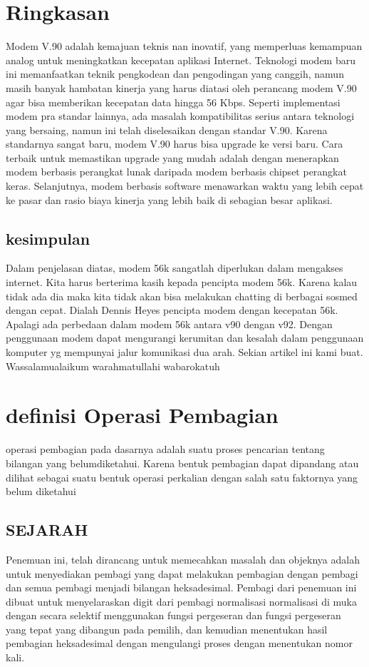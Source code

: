 \section{Ringkasan}

Modem V.90 adalah kemajuan teknis nan inovatif, yang memperluas kemampuan analog untuk meningkatkan kecepatan aplikasi Internet. Teknologi modem baru ini memanfaatkan teknik pengkodean dan pengodingan yang canggih, namun masih banyak hambatan kinerja yang harus diatasi oleh perancang modem V.90 agar bisa memberikan kecepatan data hingga 56 Kbps. Seperti implementasi modem pra standar lainnya, ada masalah kompatibilitas serius antara teknologi yang bersaing, namun ini telah diselesaikan dengan standar V.90. Karena standarnya sangat baru, modem V.90 harus bisa upgrade ke versi baru. Cara terbaik untuk memastikan upgrade yang mudah adalah dengan menerapkan modem berbasis perangkat lunak daripada modem berbasis chipset perangkat keras. Selanjutnya, modem berbasis software menawarkan waktu yang lebih cepat ke pasar dan rasio biaya kinerja yang lebih baik di sebagian besar aplikasi.

\subsection{kesimpulan}

Dalam penjelasan diatas, modem 56k sangatlah diperlukan dalam mengakses internet. Kita harus berterima kasih kepada pencipta modem 56k. Karena kalau tidak ada dia maka kita tidak akan bisa melakukan chatting di berbagai sosmed dengan cepat. Dialah Dennis Heyes pencipta modem dengan kecepatan 56k. Apalagi ada perbedaan dalam modem 56k antara v90 dengan v92. Dengan penggunaan modem dapat mengurangi kerumitan dan kesalah dalam penggunaan komputer yg mempunyai jalur komunikasi dua arah. Sekian artikel ini kami buat. Wassalamualaikum warahmatullahi wabarokatuh


\section{definisi Operasi Pembagian}
operasi pembagian pada dasarnya adalah 
suatu proses pencarian tentang bilangan yang belumdiketahui. Karena bentuk pembagian dapat dipandang atau dilihat sebagai suatu bentuk operasi perkalian dengan salah satu faktornya yang belum diketahui

\subsection{SEJARAH}
Penemuan ini,  telah dirancang untuk memecahkan masalah dan objeknya adalah untuk menyediakan pembagi yang dapat melakukan pembagian dengan pembagi 
dan semua pembagi menjadi bilangan heksadesimal. Pembagi dari penemuan ini dibuat untuk menyelaraskan digit dari pembagi normalisasi normalisasi di muka 
dengan secara selektif menggunakan fungsi pergeseran dan fungsi pergeseran yang tepat yang dibangun pada pemilih, 
dan kemudian menentukan hasil pembagian heksadesimal dengan mengulangi proses dengan menentukan nomor kali.

